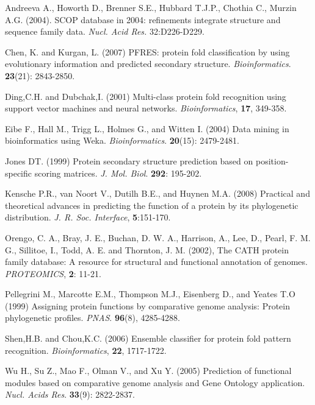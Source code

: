 \documentclass{bioinfo}
\begin{document}
\begin{thebibliography}{}
\begin{raggedright}
 Andreeva A., Howorth D., Brenner S.E., Hubbard T.J.P., Chothia C., Murzin A.G. (2004). SCOP database in 2004: refinements integrate structure and sequence family data. \textit{Nucl. Acid Res.} 32:D226-D229.

 Chen, K. and Kurgan, L. (2007) PFRES: protein fold classification by using evolutionary information and predicted secondary structure. \textit{Bioinformatics}. \textbf{23}(21): 2843-2850.

 Ding,C.H. and Dubchak,I. (2001) Multi-class protein fold recognition using support vector machines and neural networks. \textit{Bioinformatics}, \textbf{17}, 349-358.

 Eibe F., Hall M., Trigg L., Holmes G., and Witten I. (2004) Data mining in bioinformatics using Weka. \textit{Bioinformatics}. \textbf{20}(15): 2479-2481.

 Jones DT. (1999) Protein secondary structure prediction based on position-specific scoring matrices. \textit{J. Mol. Biol}. \textbf{292}: 195-202.

 Kensche P.R., van Noort V., Dutilh B.E., and Huynen M.A. (2008) Practical and theoretical advances in predicting the function of a protein by its phylogenetic distribution. \textit{J. R. Soc. Interface}, \textbf{5}:151-170.

 Orengo, C. A., Bray, J. E., Buchan, D. W. A., Harrison, A., Lee, D., Pearl, F. M. G., Sillitoe, I., Todd, A. E. and Thornton, J. M. (2002), The CATH protein family database: A resource for structural and functional annotation of genomes. \textit{PROTEOMICS}, \textbf{2}: 11-21.

 Pellegrini M., Marcotte E.M., Thompson M.J., Eisenberg D., and Yeates T.O (1999) Assigning protein functions by comparative genome analysis: Protein phylogenetic profiles. \textit{PNAS}. \textbf{96}(8), 4285-4288.

 Shen,H.B. and Chou,K.C. (2006) Ensemble classifier for protein fold pattern recognition. \textit{Bioinformatics}, \textbf{22}, 1717-1722.

 Wu H., Su Z., Mao F., Olman V., and Xu Y. (2005) Prediction of functional modules based on comparative genome analysis and Gene Ontology application. \textit{Nucl. Acids Res}. \textbf{33}(9): 2822-2837.

\end{raggedright}
\end{thebibliography}
\end{document}
